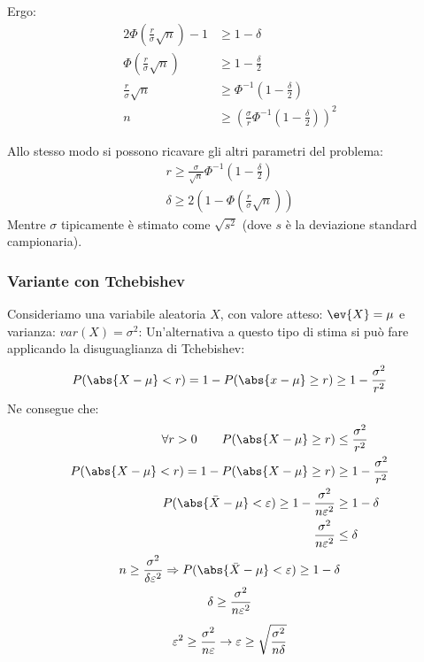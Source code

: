 Ergo:
\begin{align*}
	2\Phi\left(\frac{r}{\sigma}\sqrt{n}\right) - 1 & \geq 1 - \delta                                                              \\
	\Phi\left(\frac{r}{\sigma}\sqrt{n}\right)      & \geq 1 - \frac{\delta}{2}                                                    \\
	\frac{r}{\sigma}\sqrt{n}                       & \geq \Phi^{-1}\left(1-\frac{\delta}{2}\right)                                \\
	n                                              & \geq \left(\frac{\sigma}{r}\Phi^{-1}\left(1-\frac{\delta}{2}\right)\right)^2
\end{align*}

Allo stesso modo si possono ricavare gli altri parametri del problema:
\begin{gather*}
	r \geq \frac{\sigma}{\sqrt{n}}\Phi^{-1}\left(1-\frac{\delta}{2}\right) \\
	\delta \geq 2\left(1-\Phi\left(\frac{r}{\sigma}\sqrt{n}\right)\right)
\end{gather*}
Mentre $\sigma$ tipicamente è stimato come $\sqrt{s^2}$ (dove $s$ è la deviazione standard campionaria).
\subsubsection{Variante con Tchebishev}
Consideriamo una variabile aleatoria $X$, con valore atteso: $\ev{X} = \mu$ e varianza: $var(X) = \sigma^2$:
Un'alternativa a questo tipo di stima si può fare applicando la disuguaglianza di Tchebishev:
\begin{equation*}
 P(\abs{X - \mu} < r) = 1- P(\abs{x-\mu} \geq r) \geq 1 - \frac{\sigma^2}{r^2}
\end{equation*}
Ne consegue che:
\begin{align*}
	\forall r > 0 \qquad P(\abs{X-\mu}\geq r)                                                       & \leq \frac{\sigma^2}{r^2}     \\
	P(\abs{X-\mu} < r) = 1-P(\abs{X-\mu}\geq r)                                & \geq 1 - \frac{\sigma^2}{r^2} \\
	P(\abs{\bar X-\mu} < \varepsilon) \geq 1 - \frac{\sigma^2}{n\varepsilon^2} & \geq 1-\delta                 \\
	\frac{\sigma^2}{n\varepsilon^2}                                            & \leq \delta                   \\
\end{align*}
\begin{gather*}
	n \geq \frac{\sigma^2}{\delta\varepsilon^2} \Rightarrow P(\abs{\bar X-\mu}<\varepsilon) \geq 1-\delta \\
	\delta\geq\frac{\sigma^2}{n\varepsilon^2} \\[1ex]
	\varepsilon^2 \geq \frac{\sigma^2}{n\varepsilon} \rightarrow \varepsilon \geq \sqrt{\frac{\sigma^2}{n\delta}}
\end{gather*}

